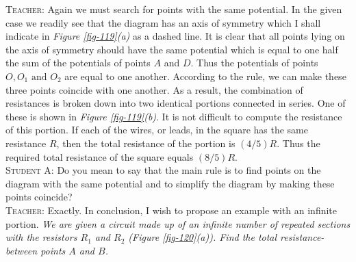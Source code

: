 \documentclass[a4paper,sfsidenotes]{tufte-book}
\begin{document}
\textsc{Teacher:} Again we must search for points with the same potential. In the given case we readily see that the diagram has an axis of symmetry which I shall indicate in \emph{Figure \ref{fig-119}(a)} as a dashed line. It is clear that all points lying on the axis of symmetry should have the same potential which is equal to one half the sum of the potentials of points $A$ and $D$. Thus the potentials of points $O, O_{1} \,\, \text{and} \,\, O_{2}$ are equal to one another. According to the rule, we can make these three points coincide with one another. As a result, the combination of resistances is broken down into two identical portions connected in series. One of these is shown in \emph{Figure \ref{fig-119}(b)}. It is not difficult to compute the resistance of this portion. If each of the wires, or leads, in the square has the same resistance $R$, then the total resistance of the portion is $(4/5) R$. Thus the required total resistance of the square equals $(8/5) R$.
\\
\textsc{Student A:} Do you mean to say that the main rule is to find points on the diagram with the same potential and to simplify the diagram by making these points coincide?
\\
\textsc{Teacher:} Exactly. In conclusion, I wish to propose an example with an infinite portion. \emph{We are given a circuit made up of an infinite number of repeated sections with the resistors $R_{1}$ and $R_{2}$ (\emph{Figure \ref{fig-120}(a)}). Find the total resistance-between points $A$ and $B$.}
\end{document}
